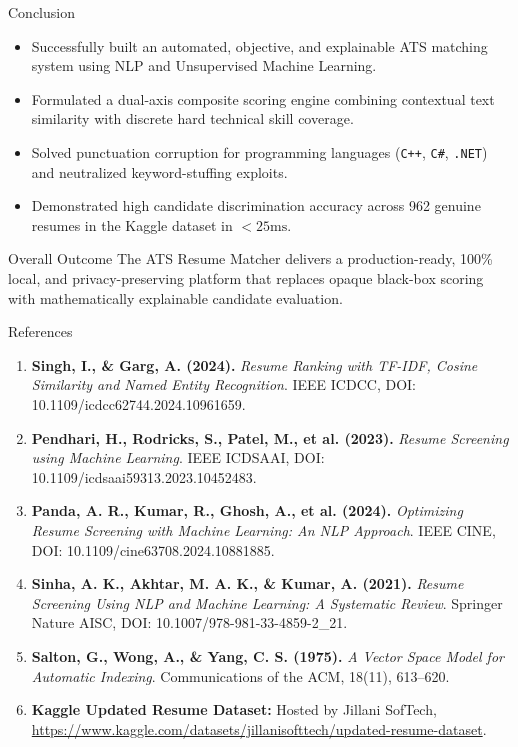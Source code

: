 \documentclass[aspectratio=169, 10pt]{beamer}
\begin{document}
\begin{frame}{Conclusion}
  \begin{itemize}
    \item Successfully built an automated, objective, and explainable ATS matching system using NLP and Unsupervised Machine Learning.
    \item Formulated a dual-axis composite scoring engine combining contextual text similarity with discrete hard technical skill coverage.
    \item Solved punctuation corruption for programming languages (\texttt{C++}, \texttt{C\#}, \texttt{.NET}) and neutralized keyword-stuffing exploits.
    \item Demonstrated high candidate discrimination accuracy across 962 genuine resumes in the Kaggle dataset in $<25\text{ms}$.
  \end{itemize}

  \vspace{0.2cm}
  \begin{block}{Overall Outcome}
    The ATS Resume Matcher delivers a production-ready, 100\% local, and privacy-preserving platform that replaces opaque black-box scoring with mathematically explainable candidate evaluation.
  \end{block}
\end{frame}

\begin{frame}{References}
  \scriptsize
  \begin{enumerate}
    \item \textbf{Singh, I., \& Garg, A. (2024).} \textit{Resume Ranking with TF-IDF, Cosine Similarity and Named Entity Recognition}. IEEE ICDCC, DOI: 10.1109/icdcc62744.2024.10961659.
    \item \textbf{Pendhari, H., Rodricks, S., Patel, M., et al. (2023).} \textit{Resume Screening using Machine Learning}. IEEE ICDSAAI, DOI: 10.1109/icdsaai59313.2023.10452483.
    \item \textbf{Panda, A. R., Kumar, R., Ghosh, A., et al. (2024).} \textit{Optimizing Resume Screening with Machine Learning: An NLP Approach}. IEEE CINE, DOI: 10.1109/cine63708.2024.10881885.
    \item \textbf{Sinha, A. K., Akhtar, M. A. K., \& Kumar, A. (2021).} \textit{Resume Screening Using NLP and Machine Learning: A Systematic Review}. Springer Nature AISC, DOI: 10.1007/978-981-33-4859-2\_21.
    \item \textbf{Salton, G., Wong, A., \& Yang, C. S. (1975).} \textit{A Vector Space Model for Automatic Indexing}. Communications of the ACM, 18(11), 613--620.
    \item \textbf{Kaggle Updated Resume Dataset:} Hosted by Jillani SofTech, \url{https://www.kaggle.com/datasets/jillanisofttech/updated-resume-dataset}.
  \end{enumerate}
\end{frame}
\end{document}
